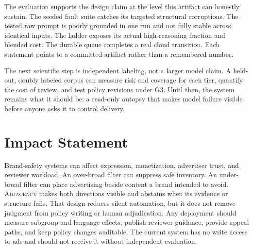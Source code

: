 \documentclass{article}
\newcommand{\Adj}{\textsc{Adjacency}\xspace}
\begin{document}
The evaluation supports the design claim at the level this artifact can honestly sustain. The seeded
fault suite catches its targeted structural corruptions. The tested raw prompt is poorly grounded in
one run and not fully stable across identical inputs. The ladder exposes its actual high-reasoning
fraction and blended cost. The durable queue completes a real cloud transition. Each statement points
to a committed artifact rather than a remembered number.

The next scientific step is independent labeling, not a larger model claim. A held-out, doubly
labeled corpus can measure risk and coverage for each tier, quantify the cost of review, and test
policy revisions under G3. Until then, the system remains what it should be: a read-only autopsy that
makes model failure visible before anyone asks it to control delivery.

\section*{Impact Statement}

Brand-safety systems can affect expression, monetization, advertiser trust, and reviewer workload.
An over-broad filter can suppress safe inventory. An under-broad filter can place advertising beside
content a brand intended to avoid. \Adj makes both directions visible and abstains when its evidence
or structure fails. That design reduces silent automation, but it does not remove judgment from
policy writing or human adjudication. Any deployment should measure subgroup and language effects,
publish reviewer guidance, provide appeal paths, and keep policy changes auditable. The current
system has no write access to ads and should not receive it without independent evaluation.



\end{document}
